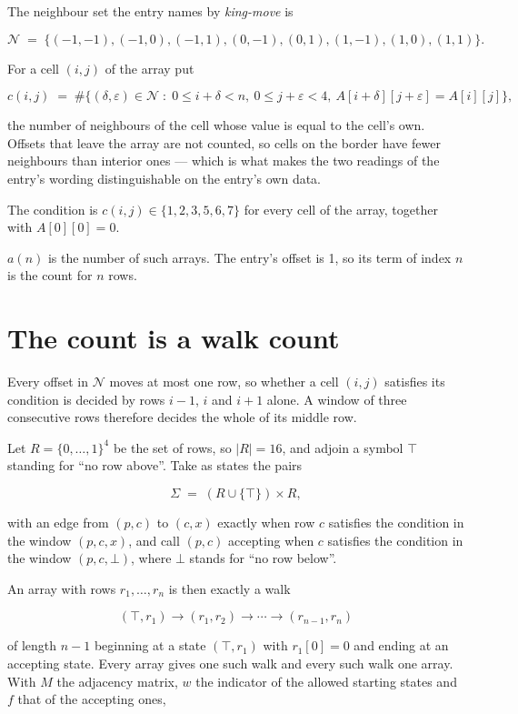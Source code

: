 \documentclass[11pt]{article}
\theoremstyle{definition}
\begin{document}
The neighbour set the entry names by {\itshape king-move} is

\[\mathcal{N} \;=\; \{(-1,-1), (-1,0), (-1,1), (0,-1), (0,1), (1,-1), (1,0), (1,1)\}.\]

For a cell $(i,j)$ of the array put

\[c(i,j) \;=\; \#\bigl\{(\delta,\varepsilon)\in\mathcal{N} \;:\; 0\le i+\delta<n,\ 0\le j+\varepsilon<4,\ A[i+\delta][j+\varepsilon] = A[i][j]\bigr\},\]

the number of neighbours of the cell whose value is equal to the cell's own. Offsets that leave the array are not counted, so cells on the border have fewer neighbours than interior ones --- which is what makes the two readings of the entry's wording distinguishable on the entry's own data.

The condition is $c(i,j) \in \{1, 2, 3, 5, 6, 7\}$ for every cell of the array, together with $A[0][0]=0$.

$a(n)$ is the number of such arrays. The entry's offset is 1, so its term of index $n$ is the count for $n$ rows.

\section{The count is a walk count}

Every offset in $\mathcal{N}$ moves at most one row, so whether a cell $(i,j)$ satisfies its condition is decided by rows $i-1$, $i$ and $i+1$ alone. A window of three consecutive rows therefore decides the whole of its middle row.

Let $R = \{0,\dots,1\}^{4}$ be the set of rows, so $|R| = 16$, and adjoin a symbol $\top$ standing for ``no row above''. Take as states the pairs

\[\Sigma \;=\; (R \cup \{\top\}) \times R,\]

with an edge from $(p,c)$ to $(c,x)$ exactly when row $c$ satisfies the condition in the window $(p,c,x)$, and call $(p,c)$ accepting when $c$ satisfies the condition in the window $(p,c,\bot)$, where $\bot$ stands for ``no row below''.

An array with rows $r_1,\dots,r_n$ is then exactly a walk

\[(\top,r_1) \to (r_1,r_2) \to \cdots \to (r_{n-1},r_n)\]

of length $n-1$ beginning at a state $(\top,r_1)$ with $r_1[0]=0$ and ending at an accepting state. Every array gives one such walk and every such walk one array. With $M$ the adjacency matrix, $w$ the indicator of the allowed starting states and $f$ that of the accepting ones,
\end{document}
